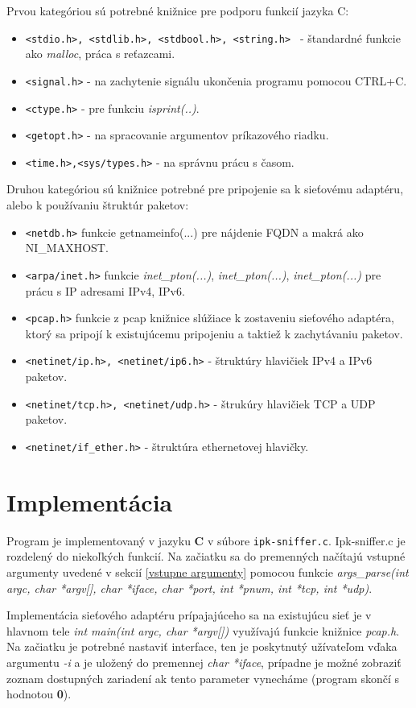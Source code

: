 \documentclass[11pt, a4paper]{article}
\begin{document}
	Prvou kategóriou sú potrebné knižnice pre podporu funkcií jazyka C:
	\begin{itemize}
	\item \texttt{<stdio.h>, <stdlib.h>, <stdbool.h>, <string.h> } - štandardné funkcie ako \emph{malloc}, práca s reťazcami.
	\item \texttt{<signal.h>} - na zachytenie signálu ukončenia programu pomocou CTRL+C.
	\item \texttt{<ctype.h>} - pre funkciu \emph{isprint(..)}.
	\item \texttt{<getopt.h>} - na spracovanie argumentov príkazového riadku.
	\item	\texttt{<time.h>,<sys/types.h>} - na správnu prácu s časom.	
	\end{itemize}
	Druhou kategóriou sú knižnice potrebné pre pripojenie sa k sieťovému adaptéru, alebo k používaniu štruktúr paketov:
	\begin{itemize}
	\item \texttt{<netdb.h>} funkcie getnameinfo(...) pre nájdenie FQDN a makrá ako NI\_MAXHOST.
	\item \texttt{<arpa/inet.h>} funkcie \emph{inet\_pton(...)}, \emph{inet\_pton(...)}, \emph{inet\_pton(...)} pre prácu s IP adresami IPv4, IPv6.
	\item \texttt{<pcap.h>} funkcie z pcap knižnice slúžiace k zostaveniu sieťového adaptéra, ktorý sa pripojí k existujúcemu pripojeniu a taktiež k zachytávaniu paketov.
	\item \texttt{<netinet/ip.h>, <netinet/ip6.h>} - štruktúry hlavičiek IPv4 a IPv6 paketov.
	\item \texttt{<netinet/tcp.h>, <netinet/udp.h>} - štrukúry hlavičiek TCP a UDP paketov.
	\item \texttt{<netinet/if\_ether.h>} - štruktúra ethernetovej hlavičky.
	\end{itemize}

	\section{Implementácia}
	Program je implementovaný v jazyku \textbf{C} v súbore \texttt{ipk-sniffer.c}.  
	Ipk-sniffer.c je rozdelený do niekoľkých funkcií. Na začiatku sa do premenných načítajú vstupné argumenty uvedené v sekcií \ref{vstupne argumenty} pomocou funkcie \emph{args\_parse(int argc, char *argv[], char *iface, char *port, int *pnum, int *tcp, int *udp)}. 
	
	
	Implementácia sieťového adaptéru prípajajúceho sa na existujúcu sieť je v hlavnom tele \emph{int main(int argc, char *argv[])} využívajú funkcie knižnice \emph{pcap.h}. Na začiatku je potrebné nastaviť interface, ten je poskytnutý užívateľom vďaka argumentu \emph{-i} a je uložený do premennej \emph{char *iface}, prípadne je možné zobraziť zoznam dostupných zariadení ak tento parameter vynecháme (program skončí s hodnotou \textbf{0}).
	
\end{document}
